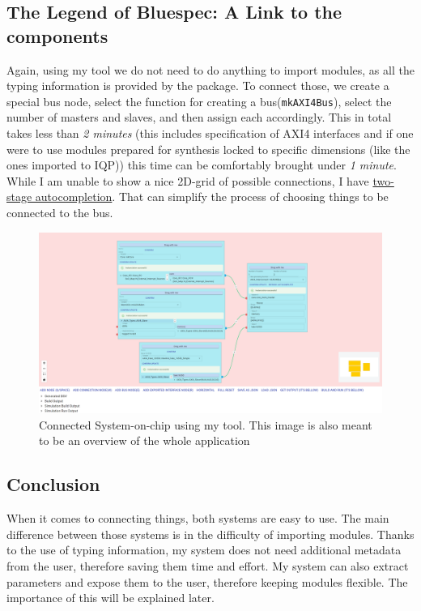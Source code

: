 \documentclass[12pt]{report}
\begin{document}
\subsection{The Legend of Bluespec: A Link to the components} 
Again, using my tool we do not need to do anything to import modules, as all the typing information is provided by the package. To connect those, we create a special bus node, select the function for creating a bus(\verb!mkAXI4Bus!), select the number of masters and slaves, and then assign each accordingly. This in total takes less than \emph{2 minutes} (this includes specification of AXI4 interfaces and if one were to use modules prepared for synthesis locked to specific dimensions (like the ones imported to IQP)) this time can be comfortably brought under \emph{1 minute}. While I am unable to show a nice 2D-grid of possible connections, I have \hyperref[sec:AutocompletionBusNode]{two-stage autocompletion}. That can simplify the process of choosing things to be connected to the bus. 
  
\begin{figure}[H] 
   \label{fig:Overview} 
   \caption{Connected System-on-chip using my tool. This image is also meant to be an overview of the whole application} 
   \includegraphics[width=\textwidth]{images/Example2MySolution.png} 
   \centering 
\end{figure} 
\subsection{Conclusion} 
When it comes to connecting things, both systems are easy to use. The main difference between those systems is in the difficulty of importing modules. Thanks to the use of typing information, my system does not need additional metadata from the user, therefore saving them time and effort. My system can also extract parameters and expose them to the user, therefore keeping modules flexible. The importance of this will be explained later. 
\end{document}
